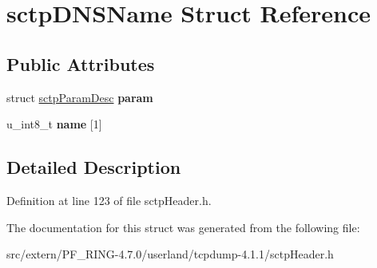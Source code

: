 \hypertarget{structsctp_d_n_s_name}{
\section{sctpDNSName Struct Reference}
\label{structsctp_d_n_s_name}
}
\subsection*{Public Attributes}
\begin{DoxyCompactItemize}
\item 
\hypertarget{structsctp_d_n_s_name_a218e8937b483bb5b296ba647765aef7d}{
struct \hyperlink{structsctp_param_desc}{sctpParamDesc} {\bfseries param}}
\label{structsctp_d_n_s_name_a218e8937b483bb5b296ba647765aef7d}

\item 
\hypertarget{structsctp_d_n_s_name_aa4f2702587704217ac6c8b6850b955f4}{
u\_\-int8\_\-t {\bfseries name} \mbox{[}1\mbox{]}}
\label{structsctp_d_n_s_name_aa4f2702587704217ac6c8b6850b955f4}

\end{DoxyCompactItemize}


\subsection{Detailed Description}


Definition at line 123 of file sctpHeader.h.



The documentation for this struct was generated from the following file:\begin{DoxyCompactItemize}
\item 
src/extern/PF\_\-RING-\/4.7.0/userland/tcpdump-\/4.1.1/sctpHeader.h\end{DoxyCompactItemize}
